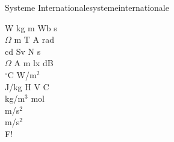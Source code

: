 \begin{song}{Systeme Internationale}{systemeinternationale}
\begin{vers}
W kg m Wb s\\
$\Omega$ m T A rad\\
cd Sv N s\\
$\Omega$ A m lx dB\\
$^\circ$C W/m$^2$\\
J/kg H V C\\
kg/m$^3$ mol\\
m/s$^2$\\
m/s$^2$\\
F!\\
\end{vers}
\end{song}
